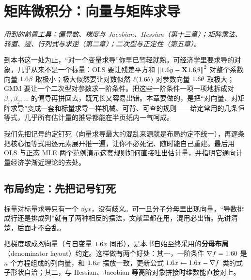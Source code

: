 \chapter{矩阵微积分：向量与矩阵求导}
\label{ch:matcalc}

\noindent\emph{用到的前置工具：偏导数、梯度与 Jacobian、Hessian（第十三章）；矩阵乘法、转置、迹、行列式与求逆（第二章）；二次型与正定性（第五章）。}
\medskip

到本书这一处为止，``对一个变量求导''你早已驾轻就熟。可经济学里要求导的对象，几乎从来不是一个标量：OLS 要让残差平方和 $\left\|1.6 y-\mathbf{X}1.6\beta\right\|_{}^2$ 对整个系数向量 $1.6\beta$ 取极小；极大似然要让对数似然 $\ell(1.6\theta)$ 对参数向量 $1.6\theta$ 取极大；GMM 要让一个二次型对参数求一阶条件。把这些一阶条件一项一项地拆成对 $\beta_1,\beta_2,\dots$ 的偏导再拼回去，既冗长又容易出错。本章要做的，是把``对向量、对矩阵求导''变成一套和标量求导一样机械、可背、可查的规则——给定常用的几条恒等式，几乎所有估计量的推导都能在半页纸内一气呵成。

我们先把记号约定钉死（向量求导最大的混乱来源就是布局约定不统一），再逐条把核心恒等式用逐元素展开推一遍，让你不必死记、随时能自己重建。最后用 OLS 与正态 MLE 两个范例演示这套规则如何直接吐出估计量，并指明它通向计量经济学渐近理论的去处。

\section{布局约定：先把记号钉死}
\label{sec:matcalc-layout}

标量对标量求导只有一个 $\dd{y}{x}$，没有歧义。可一旦分子分母里出现向量，``导数排成行还是排成列''就有了两种相反的摆法，文献里都在用，混用必出错。先讲清楚，后面才不会乱。


把梯度取成\emph{列}向量（与自变量 $1.6 x$ 同形），是本书自始至终采用的\textbf{分母布局}（denominator layout）约定。这样做有两个好处：其一，一阶条件 $\nabla f=1.6 0$ 是 $n$ 个方程组成的列向量，和 $1.6 x$ 摆放一致，更新公式 $1.6 x\leftarrow1.6 x-\nabla f$ 类的式子形状自洽；其二，与 Hessian、Jacobian 等高阶对象拼接时维数能直接对上。

